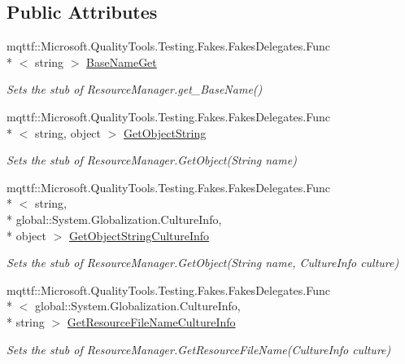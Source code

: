 \subsection*{Public Attributes}
\begin{DoxyCompactItemize}
\item 
mqttf\-::\-Microsoft.\-Quality\-Tools.\-Testing.\-Fakes.\-Fakes\-Delegates.\-Func\\*
$<$ string $>$ \hyperlink{class_system_1_1_resources_1_1_fakes_1_1_stub_resource_manager_abcdd8cede7231f75b75cfd00e3b58d69}{Base\-Name\-Get}
\begin{DoxyCompactList}\small\item\em Sets the stub of Resource\-Manager.\-get\-\_\-\-Base\-Name()\end{DoxyCompactList}\item 
mqttf\-::\-Microsoft.\-Quality\-Tools.\-Testing.\-Fakes.\-Fakes\-Delegates.\-Func\\*
$<$ string, object $>$ \hyperlink{class_system_1_1_resources_1_1_fakes_1_1_stub_resource_manager_ad879a709303a5abe6211347e573f42c9}{Get\-Object\-String}
\begin{DoxyCompactList}\small\item\em Sets the stub of Resource\-Manager.\-Get\-Object(\-String name)\end{DoxyCompactList}\item 
mqttf\-::\-Microsoft.\-Quality\-Tools.\-Testing.\-Fakes.\-Fakes\-Delegates.\-Func\\*
$<$ string, \\*
global\-::\-System.\-Globalization.\-Culture\-Info, \\*
object $>$ \hyperlink{class_system_1_1_resources_1_1_fakes_1_1_stub_resource_manager_aefd5d52ff98fa4b76a0280b95705e0c9}{Get\-Object\-String\-Culture\-Info}
\begin{DoxyCompactList}\small\item\em Sets the stub of Resource\-Manager.\-Get\-Object(\-String name, Culture\-Info culture)\end{DoxyCompactList}\item 
mqttf\-::\-Microsoft.\-Quality\-Tools.\-Testing.\-Fakes.\-Fakes\-Delegates.\-Func\\*
$<$ global\-::\-System.\-Globalization.\-Culture\-Info, \\*
string $>$ \hyperlink{class_system_1_1_resources_1_1_fakes_1_1_stub_resource_manager_aee81686f9c632a6505d40f79870b760c}{Get\-Resource\-File\-Name\-Culture\-Info}
\begin{DoxyCompactList}\small\item\em Sets the stub of Resource\-Manager.\-Get\-Resource\-File\-Name(\-Culture\-Info culture)\end{DoxyCompactList}\item 

\end{DoxyCompactItemize}
